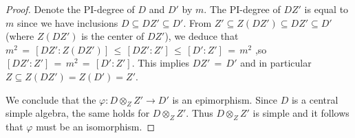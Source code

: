 \documentclass{amsart}
\numberwithin{equation}{section}
\theoremstyle{definition}
\theoremstyle{remark}
\begin{document}
\begin{proof}
    Denote the PI-degree of $D$ and $D'$ by $m$.
    The PI-degree of $DZ'$ is equal to $m$ since we have 
    inclusions $D \subseteq DZ' \subseteq D'$. From $Z' \subseteq 
    Z(DZ') \subseteq DZ' \subseteq D'$ (where $Z(DZ')$ is the center 
    of $DZ'$), we deduce that $m^{2} \,=\, [DZ':Z(DZ')] \,\leq\, 
    [DZ':Z'] \,\leq\, [D':Z'] \,=\, m^{2}$ ,so $[DZ':Z'] \,=\, m^{2} 
    \,=\, [D':Z']$. This implies $DZ' \,=\, D'$ and in particular
    $Z\subseteq Z(DZ')= Z(D')=Z'$.

    We conclude that the $\varphi : D \otimes_{Z} Z' \rightarrow D'$ 
    is an epimorphism. Since $D$ is a central simple algebra, 
    the same holds for $D \otimes_{Z} Z'$. Thus $D \otimes_{Z} Z'$ is simple 
    and it follows that $\varphi$ must be an isomorphism.
\end{proof}
\end{document}
